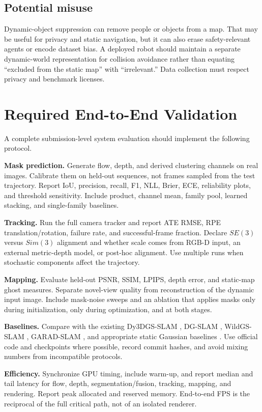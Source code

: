 \documentclass[10pt,conference]{IEEEtran}
\begin{document}
\subsection{Potential misuse}
Dynamic-object suppression can remove people or objects from a map. That may be useful for privacy and static navigation, but it can also erase safety-relevant agents or encode dataset bias. A deployed robot should maintain a separate dynamic-world representation for collision avoidance rather than equating ``excluded from the static map'' with ``irrelevant.'' Data collection must respect privacy and benchmark licenses.

\section{Required End-to-End Validation}
A complete submission-level system evaluation should implement the following protocol.

\textbf{Mask prediction.} Generate flow, depth, and derived clustering channels on real images. Calibrate them on held-out sequences, not frames sampled from the test trajectory. Report IoU, precision, recall, F1, NLL, Brier, ECE, reliability plots, and threshold sensitivity. Include product, channel mean, family pool, learned stacking, and single-family baselines.

\textbf{Tracking.} Run the full camera tracker and report ATE RMSE, RPE translation/rotation, failure rate, and successful-frame fraction. Declare $SE(3)$ versus $Sim(3)$ alignment and whether scale comes from RGB-D input, an external metric-depth model, or post-hoc alignment. Use multiple runs when stochastic components affect the trajectory.

\textbf{Mapping.} Evaluate held-out PSNR, SSIM, LPIPS, depth error, and static-map ghost measures. Separate novel-view quality from reconstruction of the dynamic input image. Include mask-noise sweeps and an ablation that applies masks only during initialization, only during optimization, and at both stages.

\textbf{Baselines.} Compare with the existing Dy3DGS-SLAM \cite{li2025dy3dgs}, DG-SLAM \cite{xu2024dg}, WildGS-SLAM \cite{zheng2025wildgs}, GARAD-SLAM \cite{li2025garad}, and appropriate static Gaussian baselines \cite{matsuki2024,keetha2024splatam}. Use official code and checkpoints where possible, record commit hashes, and avoid mixing numbers from incompatible protocols.

\textbf{Efficiency.} Synchronize GPU timing, include warm-up, and report median and tail latency for flow, depth, segmentation/fusion, tracking, mapping, and rendering. Report peak allocated and reserved memory. End-to-end FPS is the reciprocal of the full critical path, not of an isolated renderer.
\end{document}
